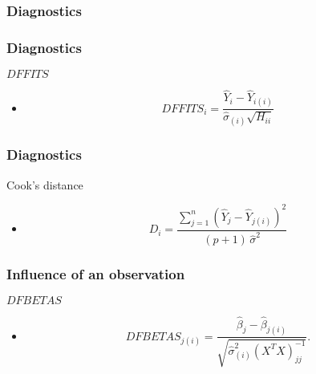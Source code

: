\documentclass[handout]{beamer}
\begin{document}


   \begin{frame}
   \frametitle{Diagnostics}
   \begin{center}
   \end{center}

   \end{frame}


   \begin{frame} \frametitle{Diagnostics}

   \begin{block}
   {$DFFITS$}
   \begin{itemize}[<+->]

   \item $$
   DFFITS_i = \frac{\widehat{Y}_i - \widehat{Y}_{i(i)}}{\widehat{\sigma}_{(i)} \sqrt{H_{ii}}}$$

   \end{itemize}

   \end{block}
   \end{frame}


   \begin{frame} \frametitle{Diagnostics}

   \begin{block}
   {Cook's distance}
   \begin{itemize}[<+->]

   \item $$
   D_i = \frac{\sum_{j=1}^n(\widehat{Y}_j - \widehat{Y}_{j(i)})^2}{(p+1) \, \widehat{\sigma}^2}$$

   \end{itemize}

   \end{block}
   \end{frame}


   \begin{frame} \frametitle{Influence of an observation}

   \begin{block}
   {$DFBETAS$}
   \begin{itemize}[<+->]

   \item $$
   DFBETAS_{j(i)} = \frac{\widehat{\beta}_j - \widehat{\beta}_{j(i)}}{\sqrt{\widehat{\sigma}^2_{(i)} (X^TX)^{-1}_{jj}}}.$$


   \end{itemize}

   \end{block}
   \end{frame}
\end{document}
